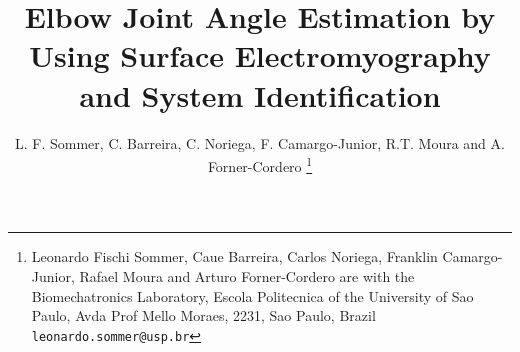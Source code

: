 \documentclass[letterpaper, 10 pt, conference]{ieeeconf}  %
\title{\LARGE \bf Elbow Joint Angle Estimation by Using Surface Electromyography and System Identification
}
\author{L. F. Sommer, C. Barreira, C. Noriega, F. Camargo-Junior, R.T. Moura and A. Forner-Cordero%
\thanks{Leonardo Fischi Sommer, Caue Barreira, Carlos Noriega, Franklin Camargo-Junior, Rafael Moura and Arturo Forner-Cordero are with the Biomechatronics Laboratory, Escola Politecnica of the University of Sao Paulo, Avda Prof Mello Moraes, 2231, Sao Paulo, Brazil {\tt\small leonardo.sommer@usp.br}}
}
\begin{document}
\newenvironment{changemargin}[2]{%
\begin{list}{}{%
\setlength{\topsep}{0pt}%
\setlength{\topmargin}{#1}%
\setlength{\leftmargin}{0cm}%
\setlength{\rightmargin}{#2}%
\setlength{\listparindent}{\parindent}%
\setlength{\itemindent}{\parindent}%
\setlength{\parsep}{\parskip}%
}%
\item[]}{\end{list}}


\maketitle
\thispagestyle{empty}
\pagestyle{empty}


\begin{abstract}



\end{abstract}
\end{document}
